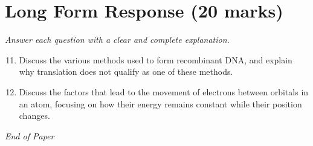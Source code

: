 \documentclass[12pt]{article}
\begin{document}
\section*{Long Form Response (20 marks)}
\textit{Answer each question with a clear and complete explanation.}
\begin{enumerate}[label=\arabic*.]
\setcounter{enumi}{10}
\item Discuss the various methods used to form recombinant DNA, and explain why translation does not qualify as one of these methods.
\item Discuss the factors that lead to the movement of electrons between orbitals in an atom, focusing on how their energy remains constant while their position changes.
\end{enumerate}

\vfill
\noindent\textit{End of Paper}
\end{document}
